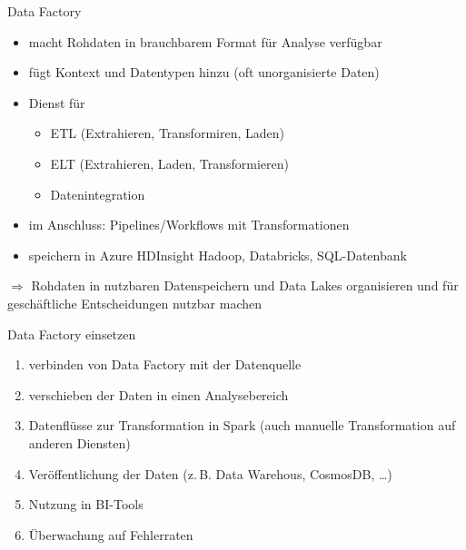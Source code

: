 \begin{flashcard}[Definition]{Data Factory}
  \begin{itemize}
    \item macht Rohdaten in brauchbarem Format für Analyse verfügbar
    \item fügt Kontext und Datentypen hinzu (oft unorganisierte Daten)
    \item Dienst für
      \begin{itemize}
        \item ETL (Extrahieren, Transformiren, Laden)
        \item ELT (Extrahieren, Laden, Transformieren)
        \item Datenintegration
      \end{itemize}
    \item im Anschluss: Pipelines/Workflows mit Transformationen
    \item speichern in Azure HDInsight Hadoop, Databricks, SQL-Datenbank
  \end{itemize}
  $\Rightarrow$ Rohdaten in nutzbaren Datenspeichern und Data Lakes organisieren und für geschäftliche Entscheidungen nutzbar machen
\end{flashcard}

\begin{flashcard}[Definition]{Data Factory einsetzen}
  \begin{enumerate}
    \item verbinden von Data Factory mit der Datenquelle
    \item verschieben der Daten in einen Analysebereich
    \item Datenflüsse zur Transformation in Spark\newline
      (auch manuelle Transformation auf anderen Diensten)
    \item Veröffentlichung der Daten (z.\,B. Data Warehous, CosmosDB, \ldots)
    \item Nutzung in BI-Tools
    \item Überwachung auf Fehlerraten
  \end{enumerate}
\end{flashcard}


